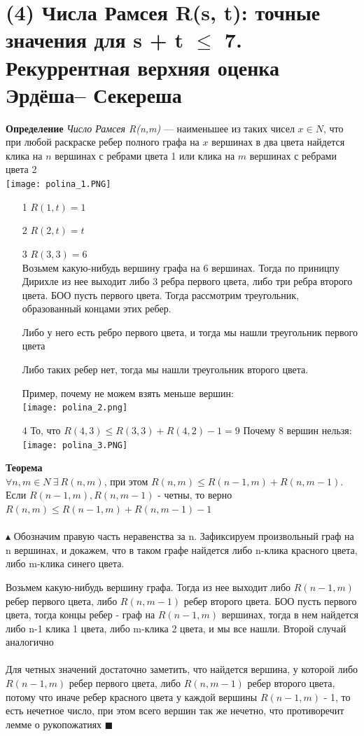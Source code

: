 \section{ (4) Числа Рамсея R(s, t): точные значения для s + t $\leq$ 7. Рекуррентная верхняя оценка Эрдёша–
Секереша}
\textbf{Определение} \textit{Число Рамсея R(n,m)}  — наименьшее из таких чисел $x \in N$, что при любой раскраске ребер полного графа на $x$ вершинах в два цвета найдется клика на $n$ вершинах с ребрами цвета 1 или клика на $m$ вершинах с ребрами цвета 2
\\
\texttt{[image: polina\_1.PNG]}
\begin{itemize}
    \item [1] $R(1,t) = 1$
    \item[2] $R(2,t) = t$
    \item[3] $R(3,3) = 6$ \\
    Возьмем какую-нибудь вершину графа на 6 вершинах. Тогда по приницпу Дирихле из нее выходит либо 3 ребра первого цвета, либо три ребра второго цвета. БОО пусть первого цвета. Тогда рассмотрим треугольник, образованный концами этих ребер. 
    
    Либо у него есть ребро первого цвета, и тогда мы нашли треугольник первого цвета
    
    Либо таких ребер нет, тогда мы нашли треугольник второго цвета.
    
    Пример, почему не можем взять меньше вершин:\\
    \texttt{[image: polina\_2.png]}
    \item[4] То, что $R(4,3) \leq R(3,3)+R(4,2) - 1 = 9$
    Почему 8 вершин нельзя:\\
    \texttt{[image: polina\_3.PNG]}
\end{itemize}
\textbf{Теорема}
\\
$\forall n, m \in N \  \exists \ R(n,m)$, при этом $R(n,m)\leq R(n - 1,m) + R(n,m - 1)$. Если $R(n - 1,m), R(n,m - 1)$ - четны, то верно $R(n,m)\leq R(n - 1,m) + R(n,m - 1) - 1$
\\
\\
$\blacktriangle$ 
Обозначим правую часть неравенства за n. Зафиксируем произвольный граф на n вершинах, и докажем, что в таком графе найдется либо n-клика красного цвета, либо m-клика синего цвета. 

Возьмем какую-нибудь вершину графа. Тогда из нее выходит либо $R(n - 1,m)$ ребер первого цвета, либо  $R(n ,m - 1)$ ребер второго цвета. БОО пусть первого цвета, тогда концы ребер - граф на  $R(n-1 ,m)$ вершинах, тогда в нем найдется либо n-1 клика 1 цвета, либо m-клика 2 цвета, и мы все нашли. Второй случай аналогично 
\\
\\
Для четных значений достаточно заметить, что найдется вершина, у которой либо $R(n - 1,m)$ ребер первого цвета, либо  $R(n ,m - 1)$ ребер второго цвета, потому что иначе ребер красного цвета у каждой вершины $R(n - 1,m)$ - 1, то есть нечетное число, при этом всего вершин так же нечетно, что противоречит лемме о рукопожатиях  $\blacksquare$

